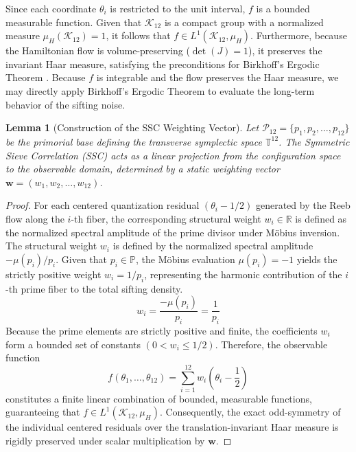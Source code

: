 \documentclass[sn-mathphys-num, pdflatex, referee]{sn-jnl}
\newtheorem{lemma}{Lemma}
\begin{document}
Since each coordinate $\theta_i$ is restricted to the unit interval, $f$ is a bounded measurable function. Given that $\mathcal{K}_{12}$ is a compact group with a normalized measure $\mu_H(\mathcal{K}_{12}) = 1$, it follows that $f \in L^1(\mathcal{K}_{12}, \mu_H)$. Furthermore, because the Hamiltonian flow is volume-preserving ($\det(J)=1$), it preserves the invariant Haar measure, satisfying the preconditions for Birkhoff's Ergodic Theorem \cite{birkhoff1931proof}. Because $f$ is integrable and the flow preserves the Haar measure, we may directly apply Birkhoff's Ergodic Theorem to evaluate the long-term behavior of the sifting noise.

\begin{lemma}[Construction of the SSC Weighting Vector] \label{lem:ssc_weights}
Let $\mathcal{P}_{12} = \{p_1, p_2, \dots, p_{12}\}$ be the primorial base defining the transverse symplectic space $\mathbb{T}^{12}$. The Symmetric Sieve Correlation (SSC) acts as a linear projection from the configuration space to the observable domain, determined by a static weighting vector $\mathbf{w} = (w_1, w_2, \dots, w_{12})$. 
\end{lemma}

\begin{proof}
For each centered quantization residual $(\theta_i - 1/2)$ generated by the Reeb flow along the $i$-th fiber, the corresponding structural weight $w_i \in \mathbb{R}$ is defined as the normalized spectral amplitude of the prime divisor under Möbius inversion. The structural weight $w_i$ is defined by the normalized spectral amplitude $-\mu(p_i)/p_i$. Given that $p_i \in \mathbb{P}$, the Möbius evaluation $\mu(p_i) = -1$ yields the strictly positive weight $w_i = 1/p_i$, representing the harmonic contribution of the $i$-th prime fiber to the total sifting density.
\begin{equation}
w_i = \frac{-\mu(p_i)}{p_i} = \frac{1}{p_i}
\end{equation}
Because the prime elements are strictly positive and finite, the coefficients $w_i$ form a bounded set of constants $(0 < w_i \le 1/2)$. Therefore, the observable function 
\begin{equation}
f(\theta_1, \dots, \theta_{12}) = \sum_{i=1}^{12} w_i \left(\theta_i - \frac{1}{2}\right)
\end{equation}
constitutes a finite linear combination of bounded, measurable functions, guaranteeing that $f \in L^1(\mathcal{K}_{12}, \mu_H)$. Consequently, the exact odd-symmetry of the individual centered residuals over the translation-invariant Haar measure is rigidly preserved under scalar multiplication by $\mathbf{w}$.
\end{proof}
\end{document}

